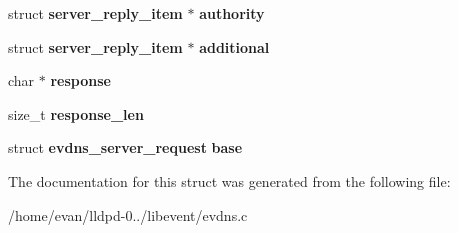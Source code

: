 \begin{DoxyCompactItemize}
\item 
struct {\bf server\-\_\-reply\-\_\-item} $\ast$ {\bfseries authority}\label{structserver__request_a03fbcf610f72e74160f6b753317a66f1}

\item 
struct {\bf server\-\_\-reply\-\_\-item} $\ast$ {\bfseries additional}\label{structserver__request_a2f31e39297d11c8606fe78cdf36098c1}

\item 
char $\ast$ {\bfseries response}\label{structserver__request_a11373f02c42587a1853ad6c8be5fe10e}

\item 
size\-\_\-t {\bfseries response\-\_\-len}\label{structserver__request_a3a79283f6c033889a1a06a0a889eec84}

\item 
struct {\bf evdns\-\_\-server\-\_\-request} {\bfseries base}\label{structserver__request_a1d71ef5d5d5d57161543ce0264a75d4b}

\end{DoxyCompactItemize}


\-The documentation for this struct was generated from the following file\-:\begin{DoxyCompactItemize}
\item 
/home/evan/lldpd-\/0../libevent/evdns.\-c\end{DoxyCompactItemize}
